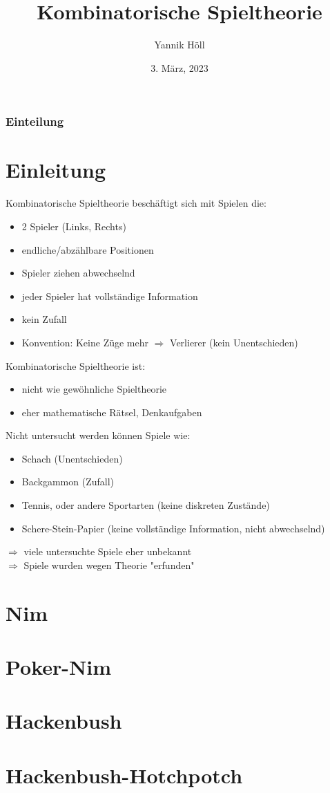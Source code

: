 \documentclass[12pt, aspectratio=169]{beamer}
\title{Kombinatorische Spieltheorie}
\author[Y. Höll]{Yannik Höll}
\date{3. März, 2023}
\begin{document}
\begin{frame}
	\titlepage
\end{frame}

\begin{frame}
	\frametitle{Einteilung}
	\tableofcontents
\end{frame}

\section{Einleitung}
\begin{frame}
Kombinatorische Spieltheorie beschäftigt sich mit Spielen die:

\begin{itemize}
    \item 2 Spieler (Links, Rechts)
    \item endliche/abzählbare Positionen
    \item Spieler ziehen abwechselnd
    \item jeder Spieler hat vollständige Information
    \item kein Zufall
    \item Konvention: Keine Züge mehr $\Rightarrow$ Verlierer (kein Unentschieden)
\end{itemize}

 {
Kombinatorische Spieltheorie ist:
\begin{itemize}
    \item nicht wie gewöhnliche Spieltheorie
    \item eher mathematische Rätsel, Denkaufgaben
\end{itemize}
}
\end{frame}

\begin{frame}
Nicht untersucht werden können Spiele wie:
\begin{itemize}
    \item<2-> Schach (Unentschieden)
    \item<3-> Backgammon (Zufall)
    \item<4-> Tennis, oder andere Sportarten (keine diskreten Zustände)
    \item<5-> Schere-Stein-Papier (keine vollständige Information, nicht abwechselnd)
\end{itemize}

 {
    $\Rightarrow$ viele untersuchte Spiele eher unbekannt \\
    $\Rightarrow$ Spiele wurden wegen Theorie "erfunden"
}
\end{frame}

\section{Nim}
\section{Poker-Nim}
\section{Hackenbush}
\section{Hackenbush-Hotchpotch}
\end{document}
